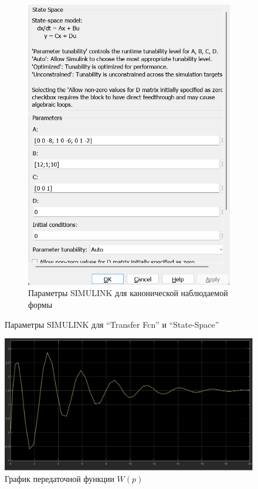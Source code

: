 \documentclass[a4paper, 12pt]{article}
\begin{document}
\begin{figure}[H]
\begin{subfigure}{0.3\textwidth}
            \includegraphics[width=\linewidth]{canonical_observable_form_1_window.png}
            \caption{Параметры SIMULINK для канонической наблюдаемой формы}
            \label{fig:cof1w}
        \end{subfigure}
        \caption{Параметры SIMULINK для ``Transfer Fcn'' и ``State-Space''}
        \label{fig:windows1}
    \end{figure}
    \begin{figure}[H]
        \centering
        \includegraphics[scale=0.3]{W_p_1.jpg}
        \captionsetup{skip=0pt}
        \caption{График передаточной функции $W(p)$}
        \label{fig:wp1}
    \end{figure}
\end{document}
